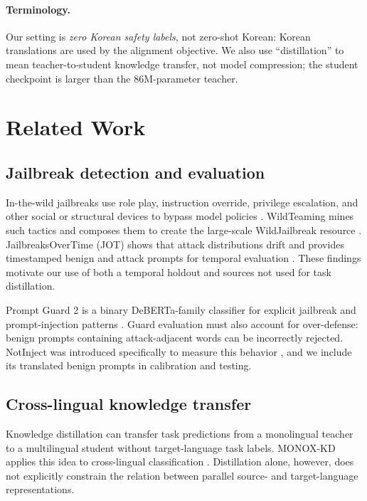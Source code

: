 \documentclass[10pt,twocolumn]{article}
\begin{document}
\paragraph{Terminology.}
Our setting is \emph{zero Korean safety labels}, not zero-shot Korean: Korean
translations are used by the alignment objective. We also use ``distillation''
to mean teacher-to-student knowledge transfer, not model compression; the
student checkpoint is larger than the 86M-parameter teacher.

\section{Related Work}

\subsection{Jailbreak detection and evaluation}

In-the-wild jailbreaks use role play, instruction override, privilege
escalation, and other social or structural devices to bypass model policies
\cite{shen2023dan}. WildTeaming mines such tactics and composes them to create
the large-scale WildJailbreak resource \cite{jiang2024wildteaming}.
JailbreaksOverTime (JOT) shows that attack distributions drift and provides
timestamped benign and attack prompts for temporal evaluation
\cite{piet2025jot}. These findings motivate our use of both a temporal holdout
and sources not used for task distillation.

Prompt Guard 2 is a binary DeBERTa-family classifier for explicit jailbreak and
prompt-injection patterns \cite{meta2025promptguard2}. Guard evaluation must
also account for over-defense: benign prompts containing attack-adjacent words
can be incorrectly rejected. NotInject was introduced specifically to measure
this behavior \cite{li2025piguard}, and we include its translated benign prompts
in calibration and testing.

\subsection{Cross-lingual knowledge transfer}

Knowledge distillation can transfer task predictions from a monolingual teacher
to a multilingual student without target-language task labels.
MONOX-KD applies this idea to cross-lingual classification
\cite{chi2020monox}. Distillation alone, however, does not explicitly constrain
the relation between parallel source- and target-language representations.
\end{document}
